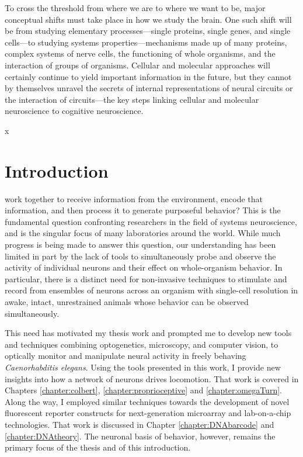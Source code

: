 \begin{savequote}[75mm] 
To cross the threshold from where we are to where we want to be, major conceptual shifts must take place in how we study the brain. One such shift will be from studying elementary processes---single proteins, single genes, and single cells---to studying systems properties---mechanisms made up of many proteins, complex systems of nerve cells, the functioning of whole organisms, and the interaction of groups of organisms. Cellular and molecular approaches will certainly continue to yield important information in the future, but they cannot by themselves unravel the secrets of internal representations of neural circuits or the interaction of circuits---the key steps linking cellular and molecular neuroscience to cognitive neuroscience. 
\end{savequote}
x


\chapter{Introduction}

 work together to receive information from the environment, encode that information, and then process it to generate  purposeful behavior?  This is the fundamental question  confronting researchers in the field of systems neuroscience, and is the singular focus of many laboratories around the world. While much progress is being made to answer this question, our understanding has been limited in part by the lack of tools to simultaneously probe and observe the activity of individual neurons and their effect on whole-organism behavior. In particular, there is a distinct need for non-invasive techniques to stimulate and record from ensembles of neurons across an organism with single-cell resolution in awake, intact, unrestrained animals whose behavior can be observed simultaneously.

This need has motivated my thesis work and prompted me to develop new tools and techniques combining optogenetics, microscopy, and computer vision, to optically monitor and manipulate neural activity in freely behaving \emph{Caenorhabditis elegans}. Using the tools presented in this work, I provide new insights into how a network of neurons drives locomotion. That work is covered in Chapters \ref{chapter:colbert}, \ref{chapter:proprioceptive} and  \ref{chapter:omegaTurn}. Along the way, I employed similar techniques  towards the development of  novel fluorescent reporter constructs for next-generation microarray and lab-on-a-chip technologies. That work is discussed in Chapter \ref{chapter:DNAbarcode} and \ref{chapter:DNAtheory}. The neuronal basis of behavior, however, remains the primary focus of the thesis and of this introduction.


